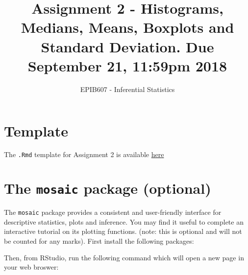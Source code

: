 \documentclass[letterpaper,9pt,twoside,printwatermark=false]{pinp}
\title{Assignment 2 - Histograms, Medians, Means, Boxplots and Standard
Deviation. Due September 21, 11:59pm 2018}
\author[a]{EPIB607 - Inferential Statistics}
\affil[a]{Fall 2018, McGill University}
\begin{document}
\verticaladjustment{-2pt}

\maketitle
\thispagestyle{firststyle}



\section*{Template}\label{template}

The \texttt{.Rmd} template for Assignment 2 is available
\href{sahirbhatnagar.com}{here}

\section*{\texorpdfstring{The \texttt{mosaic} package
(optional)}{The mosaic package (optional)}}\label{the-mosaic-package-optional}

The \texttt{mosaic} package provides a consistent and user-friendly
interface for descriptive statistics, plots and inference. You may find
it useful to complete an interactive tutorial on its plotting functions.
(note: this is optional and will not be counted for any marks). First
install the following packages:

\begin{Shaded}
\begin{Highlighting}[]
\NormalTok{(}\NormalTok{(}\NormalTok{,}\NormalTok{), } \NormalTok{)}
\end{Highlighting}
\end{Shaded}

Then, from RStudio, run the following command which will open a new page
in your web broswer:
\end{document}
